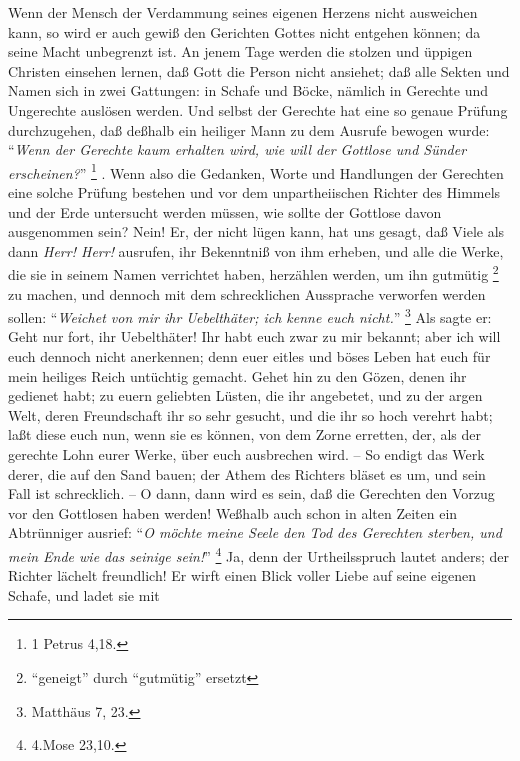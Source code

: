 Wenn der Mensch der Verdammung seines eigenen Herzens nicht ausweichen kann, so
wird er auch gewiß den Gerichten Gottes nicht entgehen können;
da seine Macht unbegrenzt ist. 
An jenem Tage werden die stolzen und üppigen Christen einsehen lernen, daß Gott
die Person nicht ansiehet;
daß alle Sekten und Namen sich in zwei Gattungen: 
in Schafe und Böcke, nämlich in Gerechte und Ungerechte auslösen werden.
Und selbst der Gerechte hat eine so genaue Prüfung durchzugehen, daß deßhalb ein
heiliger Mann zu dem Ausrufe bewogen wurde: "`\textit{Wenn der Gerechte kaum
erhalten wird, wie will der Gottlose und Sünder erscheinen?}"' \footnote{1
Petrus 4,18.} .
Wenn also die Gedanken, Worte und Handlungen der Gerechten eine solche Prüfung
bestehen und vor dem unpartheiischen Richter des Himmels und der Erde untersucht
werden müssen, wie sollte der Gottlose davon ausgenommen sein?
Nein!
Er, der nicht lügen kann, hat uns gesagt, daß Viele als dann \textit{Herr!
Herr!} ausrufen, ihr Bekenntniß von ihm erheben, und alle die Werke, die sie in
seinem Namen verrichtet haben, herzählen werden, um ihn gutmütig
\footnote{"`geneigt"' durch "`gutmütig"' ersetzt} zu machen, und dennoch mit dem
schrecklichen Aussprache verworfen werden sollen:
"`\textit{Weichet von mir ihr Uebelthäter; ich kenne euch nicht.}"'
\footnote{Matthäus 7, 23.} 
Als sagte er:
Geht nur fort, ihr Uebelthäter!
Ihr habt euch zwar zu mir bekannt;
aber ich will euch dennoch nicht anerkennen;
denn euer eitles und böses Leben hat euch für mein heiliges Reich untüchtig
gemacht.
Gehet hin zu den Gözen, denen ihr gedienet habt;
zu euern geliebten Lüsten, die ihr angebetet, und zu der argen Welt, deren
Freundschaft ihr so sehr gesucht, und die ihr so hoch verehrt habt;
laßt diese euch nun, wenn sie es können, von dem Zorne erretten, der, als der
gerechte Lohn eurer Werke, über euch ausbrechen wird.
-- So endigt das Werk derer, die auf den Sand bauen;
der Athem des Richters bläset es um, und sein Fall ist schrecklich.
-- O dann, dann wird es sein, daß die Gerechten den Vorzug vor den Gottlosen
haben werden!
Weßhalb auch schon in alten Zeiten ein Abtrünniger ausrief:
"`\textit{O möchte meine Seele den Tod des Gerechten sterben, und mein Ende wie
das seinige sein!}"' \footnote{4.Mose 23,10.} 
Ja, denn der Urtheilsspruch lautet anders;
der Richter lächelt freundlich!
Er wirft einen Blick voller Liebe auf seine eigenen Schafe, und ladet sie mit
